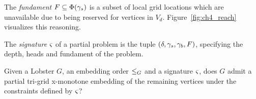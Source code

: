 The \emph{fundament} $F \subseteq \Phi(\gamma_s)$ is a subset of local grid locations which are unavailable due to being reserved for vertices in $V_d$. Figure~\ref{fig:ch4_reach} visualizes this reasoning.

The \emph{signature} $\varsigma$ of a partial problem is the tuple $(\delta, \gamma_s, \gamma_b, F)$, specifying the depth, heads and fundament of the problem.

\begin{problem}
Given a Lobster $G$, an embedding order $\leq_G$ and a signature $\varsigma$, does $G$ admit a partial tri-grid x-monotone embedding of the remaining vertices under the constraints defined by $\varsigma$?
\label{prob:partial-udc-lobster}
\end{problem}

